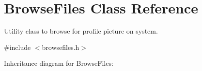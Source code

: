 \hypertarget{classBrowseFiles}{}\section{Browse\+Files Class Reference}
\label{classBrowseFiles}


Utility class to browse for profile picture on system.  




{\ttfamily \#include $<$browsefiles.\+h$>$}



Inheritance diagram for Browse\+Files\+:
